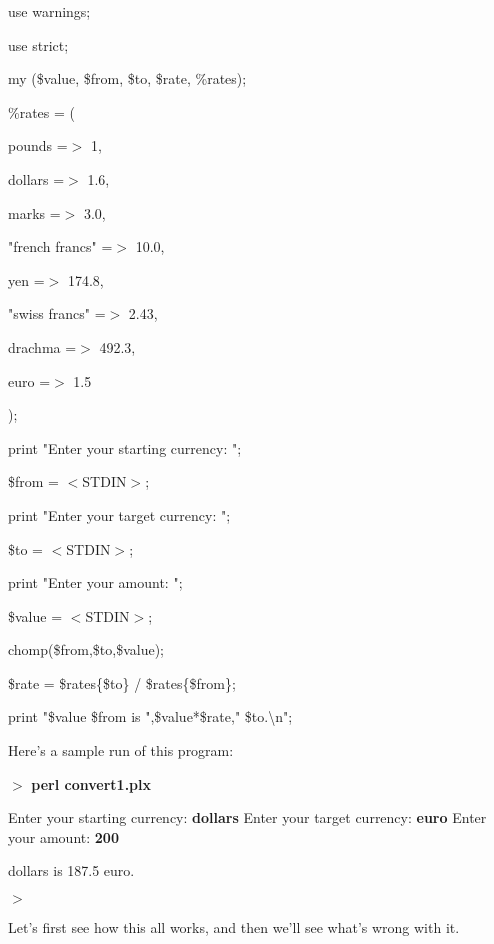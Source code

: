 \documentclass[a4paper,11pt]{book}
\begin{document}
\noindent use warnings;

\noindent use strict;

\noindent 

\noindent my (\$value, \$from, \$to, \$rate, \%rates);

\noindent \%rates = (

\noindent pounds =$>$ 1,

\noindent dollars =$>$ 1.6,

\noindent marks =$>$ 3.0,

\noindent "french francs" =$>$ 10.0,

\noindent yen =$>$ 174.8,

\noindent "swiss francs"  =$>$ 2.43,

\noindent drachma =$>$ 492.3,

\noindent euro =$>$ 1.5

\noindent );

\noindent 

\noindent print "Enter your starting currency: ";

\noindent \$from = $<$STDIN$>$;

\noindent print "Enter your target currency: ";

\noindent \$to = $<$STDIN$>$;

\noindent print "Enter your amount: ";

\noindent \$value = $<$STDIN$>$;

\noindent 

\noindent chomp(\$from,\$to,\$value);

\noindent \$rate = \$rates\{\$to\} / \$rates\{\$from\};

\noindent 

\noindent print "\$value \$from is ",\$value*\$rate," \$to.\textbackslash n";

\noindent 

\noindent Here's a sample run of this program:

\noindent 

\noindent $>$ \textbf{perl convert1.plx}

\noindent Enter your starting currency: \textbf{dollars }Enter your target currency: \textbf{euro }Enter your amount: \textbf{200}

 dollars is 187.5 euro.

\noindent $>$

\noindent 

\noindent Let's first see how this all works, and then we'll see what's wrong with it.
\end{document}
